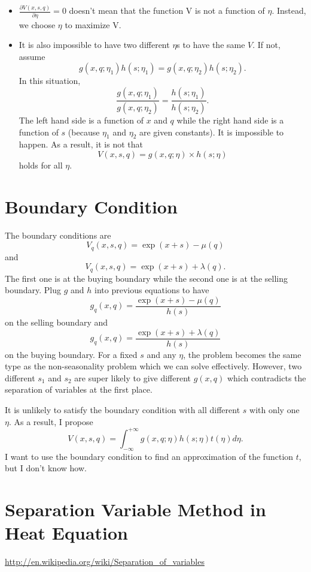 \documentclass[paper=a4, fontsize=15pt]{scrartcl} %
\numberwithin{equation}{section} %
\numberwithin{figure}{section} %
\numberwithin{table}{section} %
\begin{document}
\begin{itemize}
  \item $\frac{\partial V(x,s,q)}{\partial \eta} = 0$ doesn't mean that the function V is not a function of $\eta$. Instead, we choose $\eta$ to maximize V.
  \item It is also impossible to have two different $\eta$s to have the same $V$. If not, assume 
  \begin{equation*}
  	g(x,q;\eta_1)h(s;\eta_1) = g(x,q;\eta_2)h(s;\eta_2).
  \end{equation*}
  In this situation, 
  \begin{equation*}
  	\frac{g(x,q;\eta_1)}{g(x,q;\eta_2)} = \frac{h(s;\eta_1)}{h(s;\eta_2)}.
  \end{equation*}
  The left hand side is a function of $x$ and $q$ while the right hand side is a function of $s$ (because $\eta_1$ and $\eta_2$ are given constants). It is impossible to happen. As a result, it is not that
  \begin{equation*}
  	V(x,s,q) = g(x,q;\eta)\times h(s;\eta)
  \end{equation*}
	holds for all $\eta$.
\end{itemize}

\section{Boundary Condition}
The boundary conditions are
\begin{equation*}
  V_q(x,s,q) = \exp(x +s) - \mu(q)
\end{equation*}
and 
\begin{equation*}
  V_q(x,s,q) = \exp(x +s) + \lambda(q).
\end{equation*}
The first one is at the buying boundary while the second one is at the selling boundary.
Plug $g$ and $h$ into previous equations to have
\begin{equation*}
  g_q(x,q) = \frac{\exp(x +s) - \mu(q)}{h(s)}
\end{equation*}
on the selling boundary and
\begin{equation*}
  g_q(x,q)= \frac{\exp(x +s) + \lambda(q)}{h(s)}
\end{equation*}
on the buying boundary. For a fixed $s$ and any $\eta$, the problem becomes the same type as the non-seasonality problem which we can solve effectively. However, two different $s_1$ and $s_2$ are super likely to give different $g(x,q)$ which contradicts the separation of variables at the first place.


It is unlikely to satisfy the boundary condition with all different $s$ with only one $\eta$. As a result, I propose
\begin{equation*}
  V(x,s,q) = \int_{-\infty}^{+\infty}g(x,q;\eta)h(s;\eta)t(\eta)d\eta.
\end{equation*}
I want to use the boundary condition to find an approximation of the function $t$, but I don't know how.



\section{Separation Variable Method in Heat Equation}
\url{http://en.wikipedia.org/wiki/Separation_of_variables}
\end{document}
